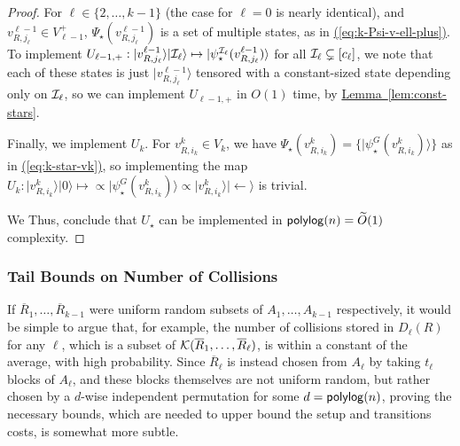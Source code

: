 \documentclass{article}
\newcommand{\eq}[1]{\hyperref[eq:#1]{(\ref*{eq:#1})}}
\newcommand{\lem}[1]{\hyperref[lem:#1]{Lemma~\ref*{lem:#1}}}
\def\ket#1{{\lvert}#1\rangle}
\renewcommand{\>}{\rangle}
\newcommand{\<}{\langle}
\renewcommand{\(}{\left(}
\renewcommand{\)}{\right)}
\begin{document}
\begin{proof}
For $\ell\in\{2,\dots,k-1\}$ (the case for $\ell=0$ is nearly identical), and $v^{\ell-1}_{R,j_{\ell}}\in V_{\ell-1}^+$, $\Psi_\star(v^{\ell-1}_{R,j_{\ell}})$ is a set of multiple states, as in \eq{k-Psi-v-ell-plus}. To implement $U_{\ell-1,+}:\ket{v^{\ell-1}_{R,j_{\ell}}}\ket{{\cal I}_{\ell}}\mapsto \ket{\psi_\star^{{\cal I}_{\ell}}(v^{\ell-1}_{R,j_{\ell}})}$ for all ${\cal I}_{\ell}\subsetneq [c_{\ell}]$, we note that each of these states is just $\ket{v^{\ell-1}_{R,j_{\ell}}}$ tensored with a constant-sized state depending only on ${\cal I}_{\ell}$, so we can implement $U_{\ell-1,+}$ in $O(1)$ time, by \lem{const-stars}.
	
	Finally, we implement $U_k$. For $v^{k}_{R,i_k} \in V_{k}$, we have $\Psi_\star(v^{k}_{R,i_k})=\{\ket{\psi_\star^G(v^{k}_{R,i_k})}\}$ as in \eq{k-star-vk}, so implementing the map $U_k:\ket{v^{k}_{R,i_k}}\ket{0}\mapsto\propto \ket{\psi_\star^G(v^{k}_{R,i_k})}\propto \ket{v^{k}_{R,i_k}}\ket{\leftarrow}$ is trivial.
	
	\noindent We Thus, conclude that $U_\star$ can be implemented in ${\sf polylog}(n)=\widetilde{O}(1)$ complexity.
\end{proof}

\subsubsection{Tail Bounds on Number of Collisions}\label{sec:k-dist-tail}

If $\overline{R}_1,\dots,\overline{R}_{k-1}$ were uniform random subsets of $A_1,\dots,A_{k-1}$ respectively, it would be simple to argue that, for example, the number of collisions stored in $D_{\ell}(R)$ for any $\ell$, which is a subset of ${\cal K}(\overline{R}_1,\dots,\overline{R}_{\ell})$, is within a constant of the average, with high probability. Since $\overline{R}_{\ell}$ is instead chosen from $A_{\ell}$ by taking $t_{\ell}$ blocks of $A_{\ell}$, and these blocks themselves are not uniform random, but rather chosen by a $d$-wise independent permutation for some $d={\sf polylog}(n)$, proving the necessary bounds, which are needed to upper bound the setup and transitions costs, is somewhat more subtle. 
\end{document}
